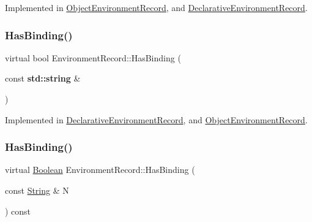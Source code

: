Implemented in \hyperlink{struct_object_environment_record_a8b7aabb730c9d2bd738f32b4a36e6bf4}{Object\+Environment\+Record}, and \hyperlink{struct_declarative_environment_record_a886564d5370eb7b2b48a5616c4d1d33a}{Declarative\+Environment\+Record}.

\mbox{\label{struct_environment_record_aa9e241cd34f23e84ecaa19cf35657e9e}} 
\subsubsection{\texorpdfstring{Has\+Binding()}{HasBinding()}\hspace{0.1cm}{\footnotesize\ttfamily [1/2]}}
{\footnotesize\ttfamily virtual bool Environment\+Record\+::\+Has\+Binding (\begin{DoxyParamCaption}\item[{const \textbf{ std\+::string} \&}]{ }\end{DoxyParamCaption})\hspace{0.3cm}{\ttfamily [pure virtual]}}



Implemented in \hyperlink{struct_declarative_environment_record_a4588f8af88b79f4317ced4dde8161813}{Declarative\+Environment\+Record}, and \hyperlink{struct_object_environment_record_a02908375958d95ff57da4f24572949f4}{Object\+Environment\+Record}.

\mbox{\label{struct_environment_record_a4e9bc2438be3466fd0d9607cdbd20225}} 
\subsubsection{\texorpdfstring{Has\+Binding()}{HasBinding()}\hspace{0.1cm}{\footnotesize\ttfamily [2/2]}}
{\footnotesize\ttfamily virtual \hyperlink{struct_boolean}{Boolean} Environment\+Record\+::\+Has\+Binding (\begin{DoxyParamCaption}\item[{const \hyperlink{struct_string}{String} \&}]{N }\end{DoxyParamCaption}) const\hspace{0.3cm}{\ttfamily [pure virtual]}}



